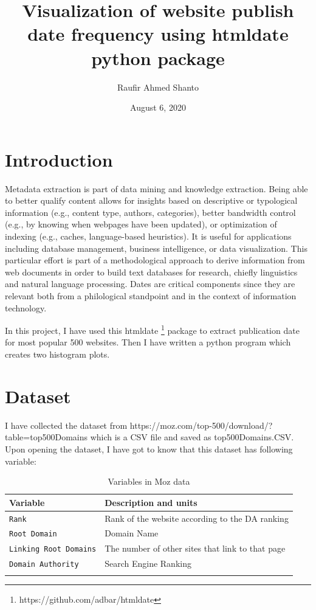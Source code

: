 \documentclass[12pt, letterpaper]{article}
\title{Visualization of website publish date frequency using htmldate python package}
\author{Raufir Ahmed Shanto}
\date{August 6, 2020}
\begin{document}
\maketitle

\section{Introduction}

Metadata extraction is part of data mining and knowledge extraction. Being able to better
qualify content allows for insights based on descriptive or typological information (e.g., content
type, authors, categories), better bandwidth control (e.g., by knowing when webpages
have been updated), or optimization of indexing (e.g., caches, language-based heuristics). It
is useful for applications including database management, business intelligence, or data visualization.
This particular effort is part of a methodological approach to derive information
from web documents in order to build text databases for research, chiefly linguistics and natural
language processing. Dates are critical components since they are relevant both from a
philological standpoint and in the context of information technology.

 
In this project, I have used this htmldate \footnote{https://github.com/adbar/htmldate} package to extract publication date for most popular 500 websites. Then I have written a python program which creates two histogram plots.

\section{Dataset}


I have collected the dataset from https://moz.com/top-500/download/?table=top500Domains which is a CSV file and saved as top500Domains.CSV. Upon opening the dataset, I have got to know that this dataset has following variable:

\begin{table}[h]
\begin{tabular}{|l|l|}
\hline
Variable & Description and units                                                      \\ \hline
\texttt{Rank}    & Rank of the website according to the DA ranking                          \\
\texttt{Root Domain}     & Domain Name                                                \\
\texttt{Linking Root Domains}    &  The number of other sites that link to that page        \\
\texttt{Domain Authority}    & Search Engine Ranking                                                      \\
              \\ \hline
\end{tabular}
\caption{Variables in Moz data}

\end{table}
\end{document}
